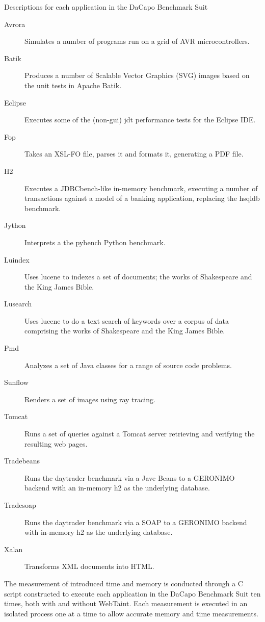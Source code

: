 \begin{table}[H]
  \centering
  \caption{Descriptions for each application in the DaCapo Benchmark Suit \parencite{dacapoBench}}
    \label{table:DaCapoTests}
    \begin{description}
        \item [Avrora] Simulates a number of programs run on a grid of AVR microcontrollers.
        \item [Batik] Produces a number of Scalable Vector Graphics (SVG) images based on the unit tests in Apache Batik.
        \item [Eclipse] Executes some of the (non-gui) jdt performance tests for the Eclipse IDE.
        \item [Fop] Takes an XSL-FO file, parses it and formats it, generating a PDF file.
        \item [H2] Executes a JDBCbench-like in-memory benchmark, executing a number of transactions against a model of a banking application, replacing the hsqldb benchmark.
        \item [Jython] Interprets a the pybench Python benchmark.
        \item [Luindex] Uses lucene to indexes a set of documents; the works of Shakespeare and the King James Bible.
        \item [Lusearch] Uses lucene to do a text search of keywords over a corpus of data comprising the works of Shakespeare and the King James Bible.
        \item [Pmd] Analyzes a set of Java classes for a range of source code problems.
        \item [Sunflow] Renders a set of images using ray tracing.
        \item [Tomcat] Runs a set of queries against a Tomcat server retrieving and verifying the resulting web pages.
        \item [Tradebeans] Runs the daytrader benchmark via a Jave Beans to a GERONIMO backend with an in-memory h2 as the underlying database.
        \item [Tradesoap] Runs the daytrader benchmark via a SOAP to a GERONIMO backend with in-memory h2 as the underlying database.
        \item [Xalan] Transforms XML documents into HTML.
    \end{description}
\end{table}

The measurement of introduced time and memory is conducted through a C script constructed to execute each application in the DaCapo Benchmark Suit ten times, both with and without WebTaint. Each measurement is executed in an isolated process one at a time to allow accurate memory and time measurements.